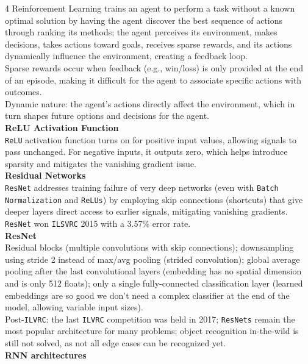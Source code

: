 \documentclass[8pt]{extarticle}
\begin{document}
\begin{multicols}{4}
Reinforcement Learning trains an agent to perform a task without a known optimal solution by having the agent discover the best sequence of actions through ranking its methods; the agent perceives its environment, makes decisions, takes actions toward goals, receives sparse rewards, and its actions dynamically influence the environment, creating a feedback loop.\\
Sparse rewards occur when feedback (e.g., win/loss) is only provided at the end of an episode, making it difficult for the agent to associate specific actions with outcomes.\\
Dynamic nature: the agent's actions directly affect the environment, which in turn shapes future options and decisions for the agent.\\
\vspace{2pt}\textbf{ReLU Activation Function}\\
\texttt{ReLU} activation function turns on for positive input values, allowing signals to pass unchanged. For negative inputs, it outputs zero, which helps introduce sparsity and mitigates the vanishing gradient issue.\\
\vspace{2pt}\textbf{Residual Networks}\\
\texttt{ResNet} addresses training failure of very deep networks (even with \texttt{Batch Normalization} and \texttt{ReLUs}) by employing skip connections (shortcuts) that give deeper layers direct access to earlier signals, mitigating vanishing gradients.\\
\texttt{ResNet} won \texttt{ILSVRC} 2015 with a 3.57\% error rate.\\
\vspace{2pt}\textbf{ResNet}\\
Residual blocks (multiple convolutions with skip connections); downsampling using stride 2 instead of max/avg pooling (strided convolution); global average pooling after the last convolutional layers (embedding has no spatial dimension and is only 512 floats); only a single fully-connected classification layer (learned embeddings are so good we don't need a complex classifier at the end of the model, allowing variable input sizes).\\
Post-\texttt{ILVRC}: the last \texttt{ILVRC} competition was held in 2017; \texttt{ResNets} remain the most popular architecture for many problems; object recognition in-the-wild is still not solved, as not all edge cases can be recognized yet.\\
\vspace{2pt}\textbf{RNN architectures}\\

\end{multicols}
\end{document}
